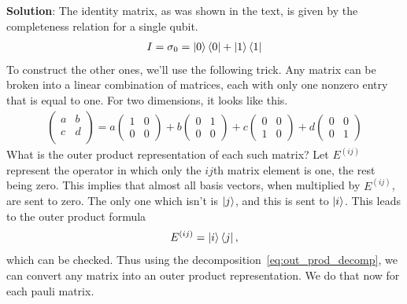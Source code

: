 \documentclass{book}
\begin{document}
    \textbf{Solution}: The identity matrix, as was shown in the text, is given by the completeness relation for a single qubit.
    \begin{align}
        I = \sigma_0  = \ket{0}\bra{0} + \ket{1}\bra{1}
    \end{align}
    To construct the other ones, we'll use the following trick. Any matrix can be broken into a linear combination of matrices, each with only one nonzero entry that is equal to one. For two dimensions, it looks like this.
    \begin{align} \label{eq:out_prod_decomp}
        \begin{pmatrix}
            a & b \\
            c & d \\
        \end{pmatrix}
        = a
        \begin{pmatrix}
            1 & 0 \\
            0 & 0
        \end{pmatrix}
        + b 
        \begin{pmatrix}
            0 & 1 \\
            0 & 0
        \end{pmatrix}
        + c
        \begin{pmatrix}
            0 & 0 \\
            1 & 0
        \end{pmatrix}
        + d
        \begin{pmatrix}
            0 & 0 \\
            0 & 1
        \end{pmatrix}
    \end{align}
    What is the outer product representation of each such matrix? Let $E^{(ij)}$ represent the operator in which only the $ij$th matrix element is one, the rest being zero. This implies that almost all basis vectors, when multiplied by $E^{(ij)}$, are sent to zero. The only one which isn't is $\ket{j}$, and this is sent to $\ket{i}$. This leads to the outer product formula
    \begin{align}
        E^{(ij)} = \ket{i}\bra{j},
    \end{align}
    which can be checked. Thus using the decomposition~\eqref{eq:out_prod_decomp}, we can convert any matrix into an outer product representation. We do that now for each pauli matrix.
\end{document}
